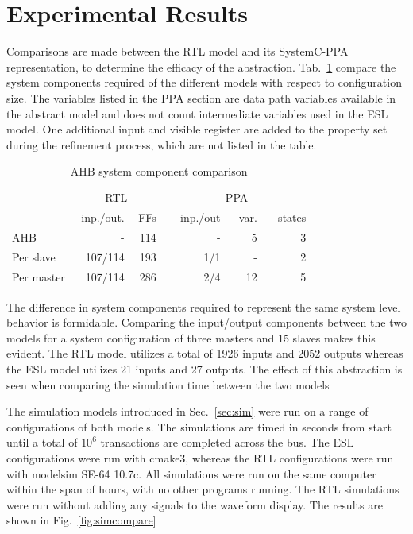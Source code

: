 \section{Experimental Results}
 
Comparisons are made between the RTL model and its SystemC-PPA representation, to determine the efficacy of the abstraction. Tab.~\ref{tab:stats} compare the system components required of the different models with respect to configuration size. The variables listed in the PPA section are data path variables available in the abstract model and does not count intermediate variables used in the ESL model. One additional input and visible register are added to the property set during the refinement process, which are not listed in the table. 

\begin{table}[hbt] 
  \begin{tabular}{ l r r r r r}
  \hline 
  \hline
      & \multicolumn{2}{c}{\textbf{\_\_\_}RTL\textbf{\_\_\_}} & \multicolumn{3}{c}{\textbf{\_\_\_\_\_\_}PPA\textbf{\_\_\_\_\_\_}} \\
   & inp./out. & FFs & inp./out & var. & states \\
    \hline
  AHB & - & 114 & - & 5 & 3 \\
  
  Per slave & 107/114 & 193 & 1/1 & - & 2 \\
 
  Per master & 107/114 & 286 & 2/4 & 12 & 5 \\
    \hline
    \hline  
  \end{tabular}
\caption{AHB system component comparison}
\label{tab:stats}
\end{table}

The difference in system components required to represent the same system level behavior is formidable. Comparing the input/output components between the two models for a system configuration of three masters and 15 slaves makes this evident. The RTL model utilizes a total of 1926 inputs and 2052 outputs whereas the ESL model utilizes 21 inputs and 27 outputs. The effect of this abstraction is seen when comparing the simulation time between the two models \par 
The simulation models introduced in Sec.~\ref{sec:sim} were run on a range of configurations of both models. The simulations are timed in seconds from start until a total of $10^6$ transactions are completed across the bus. The ESL configurations were run with cmake3, whereas the RTL configurations were run with modelsim SE-64 10.7c. All simulations were run on the same computer within the span of hours, with no other programs running. The RTL simulations were run without adding any signals to the waveform display. The results are shown in Fig.~\ref{fig:simcompare} 
\newpage 

